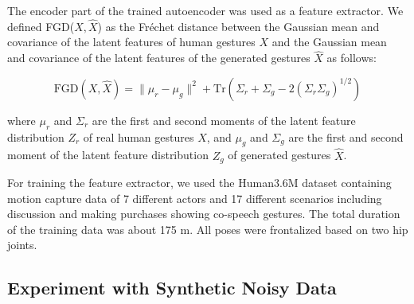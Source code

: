 \documentclass[acmtog]{acmart}
\begin{document}
The encoder part of the trained autoencoder was used as a feature extractor. We defined FGD($X, \hat{X}$) as the Fr\'{e}chet distance between the Gaussian mean and covariance of the latent features of human gestures $X$ and the Gaussian mean and covariance of the latent features of the generated gestures $\hat{X}$ as follows:

\begin{equation} 
\textrm{FGD}(X, \hat{X})=\lVert \mu_r - \mu_g \rVert^2 + \textrm{Tr}(\Sigma_r + \Sigma_g - 2(\Sigma_r \Sigma_g)^{1/2})
\end{equation}

\noindent where $\mu_r$ and $\Sigma_r$ are the first and second moments of the latent feature distribution $Z_r$ of real human gestures $X$, and $\mu_g$ and $\Sigma_g$ are the first and second moment of the latent feature distribution $Z_g$ of generated gestures $\hat{X}$.

For training the feature extractor, we used the Human3.6M dataset \cite{ionescu2013human3} containing motion capture data of 7 different actors and 17 different scenarios including discussion and making purchases showing co-speech gestures. The total duration of the training data was about 175 m. All poses were frontalized based on two hip joints. 

\subsection{Experiment with Synthetic Noisy Data} \label{sec:validation}
\end{document}
